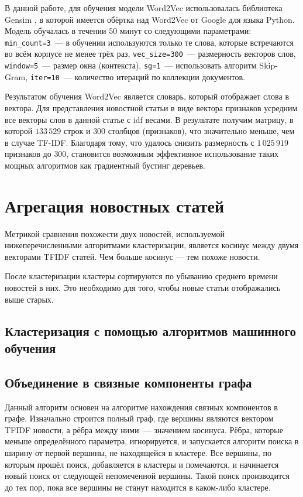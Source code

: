 \documentclass[a4paper, 14pt]{extarticle}
\begin{document}
В данной работе, для обучения модели Word2Vec использовалась библиотека Gensim \cite{rehurek_lrec}, в которой имеется обёртка над Word2Vec от Google 
для языка Python. Модель обучалась в течении 50 минут со следующими параметрами: \verb|min_count=3|~--- в обучении используются только те слова, 
которые встречаются во всём корпусе не менее трёх раз, \verb|vec_size=300|~--- размерность векторов слов, \verb|window=5|~--- размер окна 
(контекста), \verb|sg=1|~--- использовать алгоритм Skip-Gram, \verb|iter=10|~--- количество итераций по коллекции документов.

Результатом обучения Word2Vec является словарь, который отображает слова в вектора. Для представления новостной статьи в виде вектора признаков
усредним все векторы слов в данной статье с idf весами. В результате получим матрицу, в которой $133\,529$ строк и $300$ столбцов (признаков), что
значительно меньше, чем в случае TF-IDF. Благодаря тому, что удалось снизить размерность с $1\,025\,919$ признаков до $300$, становится
возможным эффективное использование таких мощных алгоритмов как градиентный бустинг деревьев.
 
\section{Агрегация новостных статей}
Метрикой сравнения похожести двух новостей, используемой нижеперечисленными алгоритмами кластеризации, является косинус между двумя векторами TFIDF статей. Чем больше косинус --- тем похоже новости.

После кластеризации кластеры сортируются по убыванию среднего времени новостей в них. Это необходимо для того, чтобы новые
статьи отображались выше старых.

\subsection{Кластеризация с помощью алгоритмов машинного обучения}

\subsection{Объединение в связные компоненты графа}
Данный алгоритм основен на алгоритме нахождения связных компонентов в графе. Изначально строится полный граф,
где вершины являются вектором TFIDF новости, а рёбра между ними~--- значением косинуса. Рёбра, которые меньше определённого
параметра, игнорируется, и запускается алгоритм поиска в ширину от первой вершины, не находящейся в кластере. Все вершины,
по которым прошёл поиск, добавляется в кластеры и помечаются, и начинается новый поиск от следующей непомеченной вершины.
Такой поиск производится до тех пор, пока все вершины не станут находится в каком-либо кластере.
\end{document}
